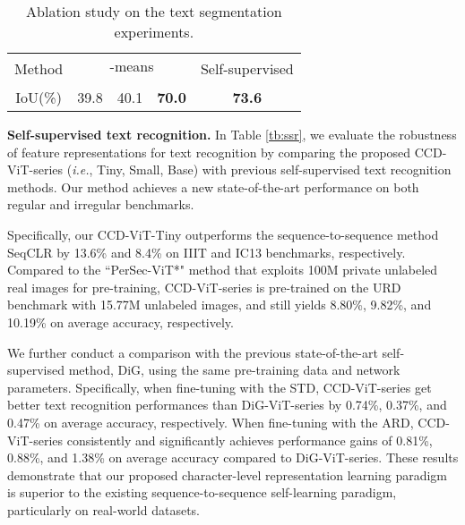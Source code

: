 \documentclass[10pt,twocolumn,letterpaper]{article}
\begin{document}
\begin{table}[t]
  \centering
  \caption{Ablation study on the text segmentation experiments.}
\begin{tabular}{cccccccc}
  \toprule
  \multirow{2}{*}{Method} & \multicolumn{6}{c}{-means} & \multirow{2}{*}{Self-supervised}\\ 
  \cline{2-7} & \multicolumn{2}{c}{} & \multicolumn{2}{c}{} & \multicolumn{2}{c}{} \\
  \midrule
  IoU(\%) &\multicolumn{2}{c}{39.8} &\multicolumn{2}{c}{40.1} &\multicolumn{2}{c}{\textbf{70.0}} &\textbf{73.6}\\
  \bottomrule
  \end{tabular}
  \label{tb:pseudo label selection}
  \vspace{-1.0em}
\end{table}
\noindent \textbf{Self-supervised text recognition.}
In Table \ref{tb:ssr}, we evaluate the robustness of feature representations for text recognition by comparing the proposed CCD-ViT-series (\emph{i.e.}, Tiny, Small, Base) with previous self-supervised text recognition methods. Our method achieves a new state-of-the-art performance on both regular and irregular benchmarks. 

Specifically, our CCD-ViT-Tiny outperforms the sequence-to-sequence method SeqCLR by 13.6\% and 8.4\% on IIIT and IC13 benchmarks, respectively. Compared to the ``PerSec-ViT*" method that exploits 100M private unlabeled real images for pre-training, CCD-ViT-series is pre-trained on the URD benchmark with 15.77M unlabeled images, and still yields 8.80\%, 9.82\%, and 10.19\% on average accuracy, respectively.

We further conduct a comparison with the previous state-of-the-art self-supervised method, DiG, using the same pre-training data and network parameters. 
Specifically, when fine-tuning with the STD, CCD-ViT-series get better text recognition performances than DiG-ViT-series by 0.74\%, 0.37\%, and 0.47\% on average accuracy, respectively. When fine-tuning with the ARD, CCD-ViT-series consistently and significantly achieves performance gains of 0.81\%, 0.88\%, and 1.38\% on average accuracy compared to DiG-ViT-series. These results demonstrate that our proposed character-level representation learning paradigm is superior to the existing sequence-to-sequence self-learning paradigm, particularly on real-world datasets.
  
\end{document}
